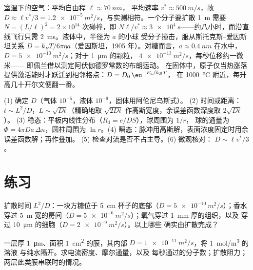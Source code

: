 \begin{example}[从分子到 $D$]\label{ex:b2:particle-diffusion:kinetic}
室温下的空气：平均自由程 $\ell \approx \qty{70}{nm}$，
平均速率 $v^* \approx \qty{500}{m/s}$，故 $D \approx \ell v^*/3 =
\qty{1.2e-5}{m^2/s}$，与实测相符。一个分子要扩散 \qty{1}{m}
需要 $N = (L/\ell)^2 = 2 \times 10^{14}$ 次碰撞，即 $N\ell/v^*
\approx \qty{3e4}{s}$——约八小时，而沿直线飞行只需
\qty{2}{ms}。液体中，半径为 $a$ 的小球
受分子撞击，服从斯托克斯–爱因斯坦关系 $D =
k_BT/6\pi\eta a$（爱因斯坦，1905 年）。对糖而言，$a \approx \qty{0.4}{nm}$
在水中，$D = \qty{5e-10}{m^2/s}$；对于 \qty{1}{\micro m} 的颗粒，
$\qty{4e-13}{m^2/s}$，每秒位移约一微米——
即佩兰借以测定阿伏伽德罗常数的布朗运动。
在固体中，原子仅当热涨落
提供激活能时才跃迁到相邻格点：$D = D_0\,\eu^{-E_{\text{a}}/k_BT}$，
在 \qty{1000}{\celsius} 附近，每升高几十开尔文便翻一番。
\end{example}

\begin{method}[扩散估算]\label{meth:b2:particle-diffusion:method}
(1) 确定 $D$（气体 $10^{-5}$，液体 $10^{-9}$，固体用阿伦尼乌斯式）。
(2) 时间或距离：$t \sim L^2/D$，$L \sim \sqrt{Dt}$（精确地取
$\sqrt{2Dt}$ 作高斯宽度，余误差函数深度取 $2\sqrt{Dt}$）。
(3) 稳态：平板内线性分布（$R_{\text{d}} = e/DS$），球周围为 $1/r$，
球的通量为 $\Phi = 4\pi D a\,\Delta n$，圆柱周围为 $\ln r$。(4)
瞬态：脉冲用高斯解，表面浓度固定时用余误差函数解；再作叠加。
(5) 检查对流是否不占主导。(6) 微观核对：
$D \sim \ell v^*/3$。
\end{method}

\section{练习}

\begin{exercise}[$\star$]\label{exo:b2:particle-diffusion:1}
扩散时间 $L^2/D$：一块方糖位于 \qty{5}{cm}
杯子的底部（$D = \qty{5e-10}{m^2/s}$）；香水穿过 \qty{5}{m} 宽的房间（$D =
\qty{5e-6}{m^2/s}$）；氧气穿过 \qty{1}{mm} 厚的组织，以及
穿过 \qty{10}{\micro m} 的细胞（$D = \qty{2e-9}{m^2/s}$）。以上哪些
确实由扩散完成？
\end{exercise}

\begin{exercise}[$\star$]\label{exo:b2:particle-diffusion:2}
一层厚 \qty{1}{\micro m}、面积 \qty{1}{cm^2} 的膜，其内部 $D =
\qty{1e-11}{m^2/s}$，将 \qty{1}{mol/m^3} 的溶液
与纯水隔开。求电流密度、摩尔通量，以及
每秒通过的分子数；扩散阻力；两层此类膜串联时的情况。
\end{exercise}

